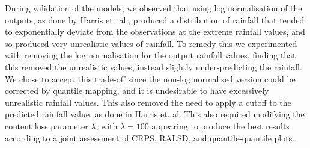 \documentclass{article}
\begin{document}

During validation of the models, we observed that using log normalisation of the outputs, as done by Harris et.~al., produced a distribution of rainfall that tended to exponentially deviate from the observations at the extreme rainfall values, and so produced very unrealistic values of rainfall. To remedy this we experimented with removing the log normalisation for the output rainfall values, finding that this removed the unrealistic values, instead slightly under-predicting the rainfall. We chose to accept this trade-off since the non-log normalised version could be corrected by quantile mapping, and it is undesirable to have excessively unrealistic rainfall values. This also removed the need to apply a cutoff to the predicted rainfall value, as done in Harris et. al. This also required modifying the content loss parameter $\lambda$, with $\lambda=100$ appearing to produce the best results according to a joint assessment of CRPS, RALSD, and quantile-quantile plots.
\end{document}
